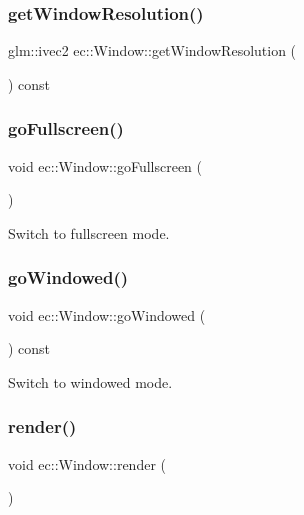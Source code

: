 \mbox{\label{classec_1_1_window_a8b44b42e9cc6e8aa1d41c0bc01543977}} 
\subsubsection{\texorpdfstring{get\+Window\+Resolution()}{getWindowResolution()}}
{\footnotesize\ttfamily glm\+::ivec2 ec\+::\+Window\+::get\+Window\+Resolution (\begin{DoxyParamCaption}{ }\end{DoxyParamCaption}) const}

\mbox{\label{classec_1_1_window_ab89e0e27d169da6f5d9430b78c77c0ee}} 
\subsubsection{\texorpdfstring{go\+Fullscreen()}{goFullscreen()}}
{\footnotesize\ttfamily void ec\+::\+Window\+::go\+Fullscreen (\begin{DoxyParamCaption}{ }\end{DoxyParamCaption})}

Switch to fullscreen mode. \mbox{\label{classec_1_1_window_aeeaa47b1f8199b4df60f74aa3b2c45f7}} 
\subsubsection{\texorpdfstring{go\+Windowed()}{goWindowed()}}
{\footnotesize\ttfamily void ec\+::\+Window\+::go\+Windowed (\begin{DoxyParamCaption}{ }\end{DoxyParamCaption}) const}

Switch to windowed mode. \mbox{\label{classec_1_1_window_acb066b817adc7c790b0810695078dee3}} 
\subsubsection{\texorpdfstring{render()}{render()}}
{\footnotesize\ttfamily void ec\+::\+Window\+::render (\begin{DoxyParamCaption}{ }\end{DoxyParamCaption})\hspace{0.3cm}{\ttfamily [virtual]}}

